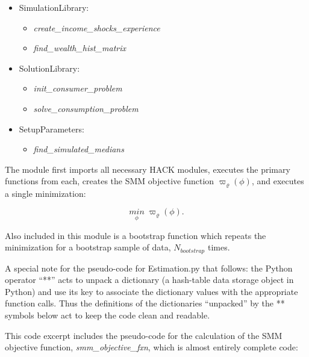 \documentclass[]{article}
\begin{document}
\begin{itemize}
\itemsep1pt\parskip0pt
\item
  SimulationLibrary:

  \begin{itemize}
  \itemsep1pt\parskip0pt
  \item
    \emph{create\_income\_shocks\_experience}
  \item
    \emph{find\_wealth\_hist\_matrix}
  \end{itemize}
\item
  SolutionLibrary:

  \begin{itemize}
  \itemsep1pt\parskip0pt
  \item
    \emph{init\_consumer\_problem}
  \item
    \emph{solve\_consumption\_problem}
  \end{itemize}
\item
  SetupParameters:

  \begin{itemize}
  \itemsep1pt\parskip0pt
  \item
    \emph{find\_simulated\_medians}
  \end{itemize}
\end{itemize}

The module first imports all necessary HACK modules, executes the
primary functions from each, creates the SMM objective function
$\varpi_{\varrho}(\phi)$, and executes a single minimization:

\[\underset{\phi}{min} \; \varpi_{\varrho}(\phi).\]

Also included in this module is a bootstrap function which repeats the
minimization for a bootstrap sample of data, $N_{bootstrap}$ times.

A special note for the pseudo-code for Estimation.py that follows: the
Python operator ``**'' acts to unpack a dictionary (a hash-table data
storage object in Python) and use its key to associate the dictionary
values with the appropriate function calls. Thus the definitions of the
dictionaries ``unpacked'' by the ** symbols below act to keep the code
clean and readable.

This code excerpt includes the pseudo-code for the calculation of the
SMM objective function, \emph{smm\_objective\_fxn}, which is almost
entirely complete code:
\end{document}
